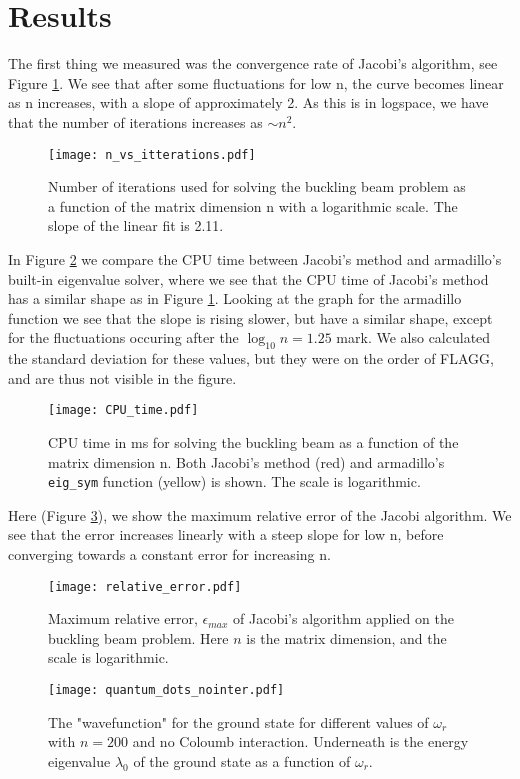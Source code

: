 \section{Results}
\label{sec:results}

The first thing we measured was the convergence rate of Jacobi's algorithm, see Figure \ref{fig:n_vs_it}.
We see that after some fluctuations for low n, the curve becomes linear as n increases, with a slope of approximately 2.
As this is in logspace, we have that the number of iterations increases as $\sim  n^2$.
\begin{figure}[htbp]
	\centering
	\texttt{[image: n\_vs\_itterations.pdf]}
	\caption{Number of iterations used for solving the buckling beam problem as a function of the matrix dimension n with a logarithmic scale. The slope of the linear fit is 2.11.}
	\label{fig:n_vs_it}
\end{figure}

In Figure \ref{fig:CPUtime} we compare the CPU time between Jacobi's method and
armadillo's built-in eigenvalue solver, where we see that the CPU time of Jacobi's method
has a similar shape as in Figure \ref{fig:n_vs_it}. Looking at the graph for the armadillo
function we see that the slope is rising slower, but have a similar shape, except
for the fluctuations occuring after the $\log_{10} n = 1.25$ mark. We also calculated
the standard deviation for these values, but they were on the order of FLAGG, and
are thus not visible in the figure.
\begin{figure}[htbp]
	\centering
	\texttt{[image: CPU\_time.pdf]}
	\caption{CPU time in ms for solving the buckling beam as a function of the matrix dimension n. Both Jacobi's method (red) and armadillo's \texttt{eig\_sym} function (yellow) is shown. The scale is logarithmic.}
	\label{fig:CPUtime}
\end{figure}

Here (Figure \ref{fig:error}), we show the maximum relative error of the Jacobi
algorithm. We see that the error increases linearly with a steep slope for low n,
before converging towards a constant error for increasing n.
\begin{figure}[htbp]
	\centering
	\texttt{[image: relative\_error.pdf]}
	\caption{Maximum relative error, $\epsilon_{max}$ of Jacobi's algorithm applied on the buckling beam problem.
	Here $n$ is the matrix dimension, and the scale is logarithmic.}
	\label{fig:error}
\end{figure}


\begin{figure}[htbp]
	\centering
	\texttt{[image: quantum\_dots\_nointer.pdf]}
	\caption{The "wavefunction" for the ground state for different values of $\omega_r$ with $n=200$ and no Coloumb interaction.
	Underneath is the energy eigenvalue $\lambda_0$ of the ground state as a function of $\omega_r$.}
	\label{fig:quantum_dots_nointer}
\end{figure}
